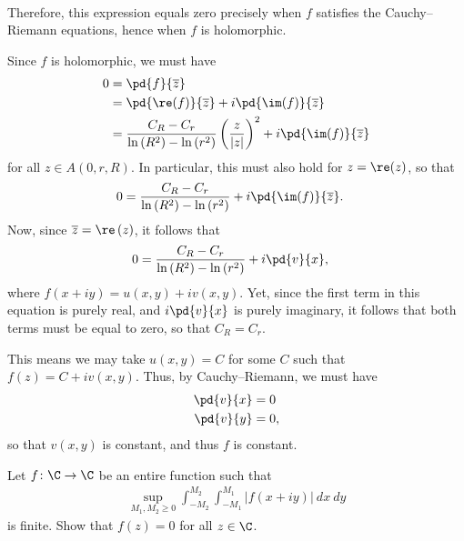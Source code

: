 \documentclass[10pt]{mypackage}
\begin{document}
\begin{solution}
\begin{aside}
\begin{align*}
    \end{align*}
    Therefore, this expression equals zero precisely when $f$ satisfies the Cauchy--Riemann equations, hence when $f$ is holomorphic.
  \end{aside}
  Since $f$ is holomorphic, we must have
  \begin{align*}
    0 &= \pd{f}{ \overline{z} }\\
      &= \pd{\re(f)}{ \overline{z} } + i \pd{ \im(f) }{ \overline{z} }\\
      &= \frac{C_R - C_r}{ \ln\left( R^2 \right) - \ln\left( r^2 \right) } \left( \frac{z}{\left\vert z \right\vert} \right)^2 + i \pd{\im(f)}{ \overline{z} }
  \end{align*}
  for all $z\in A\left( 0,r,R \right)$. In particular, this must also hold for $ z = \re(z) $, so that
  \begin{align*}
    0 &= \frac{C_R - C_r}{\ln\left( R^2 \right) - \ln\left( r^2 \right)} + i \pd{\im(f)}{ \overline{z} }.
  \end{align*}
  Now, since $ \overline{z} = \re\left( z \right) $, it follows that
  \begin{align*}
    0 &= \frac{C_R - C_r}{\ln\left( R^2 \right) - \ln\left( r^2 \right)} + i \pd{v}{ x },
  \end{align*}
  where $ f\left( x + iy \right) = u\left( x,y \right) + i v\left( x,y \right) $. Yet, since the first term in this equation is purely real, and $ i \pd{v}{x} $ is purely imaginary, it follows that both terms must be equal to zero, so that $C_R = C_r$.\newline

  This means we may take $u\left( x,y \right) = C$ for some $C$ such that $f(z) = C + i v\left( x,y \right)$. Thus, by Cauchy--Riemann, we must have
  \begin{align*}
    \pd{v}{x} &= 0\\
    \pd{v}{y} &= 0,
  \end{align*}
  so that $v\left( x,y \right)$ is constant, and thus $f$ is constant.
\end{solution}
\begin{problem}[Problem 3]
  Let $f\colon \C\rightarrow \C$ be an entire function such that
  \begin{align*}
    \sup_{M_1,M_2 \geq 0} \int_{-M_2}^{M_2} \int_{-M_1}^{M_1} \left\vert f\left( x + iy \right) \right\vert\:dx\:dy
  \end{align*}
  is finite. Show that $f(z) = 0$ for all $z\in \C$.
\end{problem}
\end{document}
